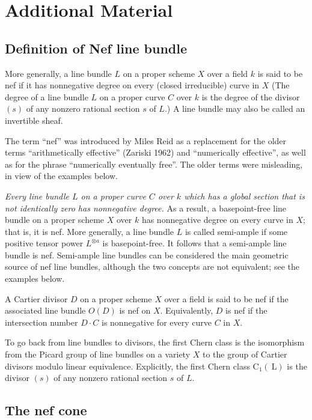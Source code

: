 \documentclass[lang=en,12pt]{beautybook}
\begin{document}
\section*{Additional Material}
\subsection*{Definition of Nef line bundle}
\begin{definition}
  More generally, a line bundle $L$ on a proper scheme $X$ over a field $k$ is said to be nef if it has nonnegative degree on every (closed irreducible) curve in $X$ (The degree of a line bundle $L$ on a proper curve $C$ over $k$ is the degree of the divisor $(s)$ of any nonzero rational section $s$ of $L$.) A line bundle may also be called an invertible sheaf.
\end{definition}

The term ``nef'' was introduced by Miles Reid as a replacement for the older terms ``arithmetically effective'' (Zariski 1962) and ``numerically effective'', as well as for the phrase ``numerically eventually free''. The older terms were misleading, in view of the examples below.

\textit{Every line bundle $L$ on a proper curve $C$ over $k$ which has a global section that is not identically zero has nonnegative degree.} As a result, a basepoint-free line bundle on a proper scheme $X$ over $k$ has nonnegative degree on every curve in $X$; that is, it is nef.  More generally, a line bundle $L$ is called semi-ample if some positive tensor power $L^{\otimes a}$ is basepoint-free. It follows that a semi-ample line bundle is nef. Semi-ample line bundles can be considered the main geometric source of nef line bundles, although the two concepts are not equivalent; see the examples below.

A Cartier divisor $D$ on a proper scheme $X$ over a field is said to be nef if the associated line bundle $O(D)$ is nef on $X$. Equivalently, $D$ is nef if the intersection number $D \cdot C$ is nonnegative for every curve $C$ in $X$.

To go back from line bundles to divisors, the first Chern class is the isomorphism from the Picard group of line bundles on a variety $X$ to the group of Cartier divisors modulo linear equivalence. Explicitly, the first Chern class $\mathrm{C}_1(\mathrm{~L})$ is the divisor $(s)$ of any nonzero rational section $s$ of $L$.

\subsection*{The nef cone}
\end{document}
